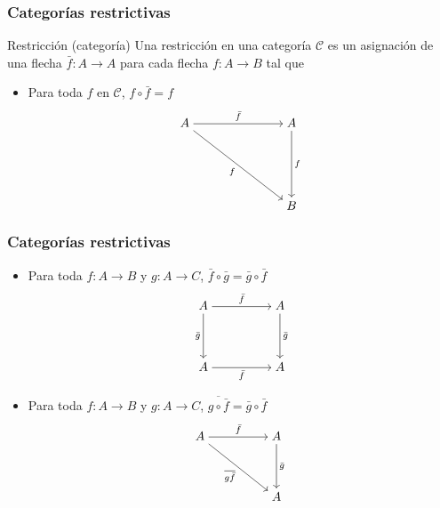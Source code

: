 \documentclass[10pt, aspectratio = 43,usenames,dvipsnames]{beamer}
\begin{document}
	\begin{frame}[t]
		\frametitle{Categorías restrictivas}
		\begin{block}{Restricción (categoría)}
			Una restricción en una categoría $\mathcal{C}$ es un asignación de una flecha $\bar{f}: A\to A$ para cada flecha $f:A\to B$ tal que
			\begin{itemize}
				\item Para toda $f$ en $\mathcal{C}$, $f\circ\bar{f} = f$
				\[\begin{tikzcd}[ampersand replacement=\&,cramped]
					A \&\&\& A \\
					\\
					\\
					\&\&\& B
					\arrow["{\bar{f}}", from=1-1, to=1-4]
					\arrow["f"', from=1-1, to=4-4]
					\arrow["f", from=1-4, to=4-4]
				\end{tikzcd}\]
			\end{itemize}
		\end{block}
	\end{frame}

	\begin{frame}[t]
		\frametitle{Categorías restrictivas}
		\begin{itemize}
			\item Para toda $f:A\to B$ y $g:A\to C$, $\bar{f}\circ\bar{g} = \bar{g}\circ\bar{f}$
			\[\begin{tikzcd}[ampersand replacement=\&,cramped]
				A \&\& A \\
				\\
				A \&\& A
				\arrow["{{\bar{f}}}", from=1-1, to=1-3]
				\arrow["{{\bar{g}}}"', from=1-1, to=3-1]
				\arrow["{{\bar{g}}}", from=1-3, to=3-3]
				\arrow["{{\bar{f}}}"', from=3-1, to=3-3]
			\end{tikzcd}\]
			\item Para toda $f:A\to B$ y $g: A\to C$, $\overline{g\circ\bar{f}} = \bar{g}\circ\bar{f}$
			\[\begin{tikzcd}[ampersand replacement=\&,cramped]
				A \&\& A \\
				\\
				\&\& A
				\arrow["{\bar{f}}", from=1-1, to=1-3]
				\arrow["{\overline{g\bar{f}}}"', from=1-1, to=3-3]
				\arrow["{\bar{g}}", from=1-3, to=3-3]
			\end{tikzcd}\]
		\end{itemize}
	\end{frame}
	
\end{document}
